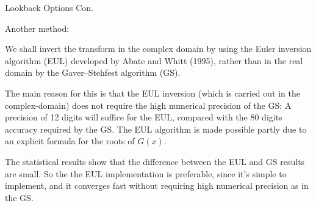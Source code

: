 \documentclass{beamer}
\begin{document}
\begin{frame}{Lookback Options Con.}


    {\footnotesize \footnotesize
    \par Another method:
    \vspace{1em}
    \par We shall invert the transform in the complex domain by using the Euler inversion algorithm
     (EUL) developed by Abate and Whitt (1995), rather than in the real domain by the Gaver--Stehfest algorithm (GS). 
    \vspace{1em}
    \par  \pause The main reason for this is that the EUL inversion (which is carried out in the complex-domain) does not require the high numerical precision of the GS: A precision of 12 digits will suffice for the EUL, compared with the 80 
    digits accuracy required by the GS. The EUL algorithm is made possible partly due to an explicit formula 
    for the roots of \( G(x) \).
    \vspace{1em}
    \par  \pause The statistical results show that the difference between the EUL and GS results are small. So the  the EUL implementation is preferable, 
    since it's simple to implement, and it converges fast without requiring high numerical precision as in the GS.
    }   
    
    
\end{frame}
\end{document}
